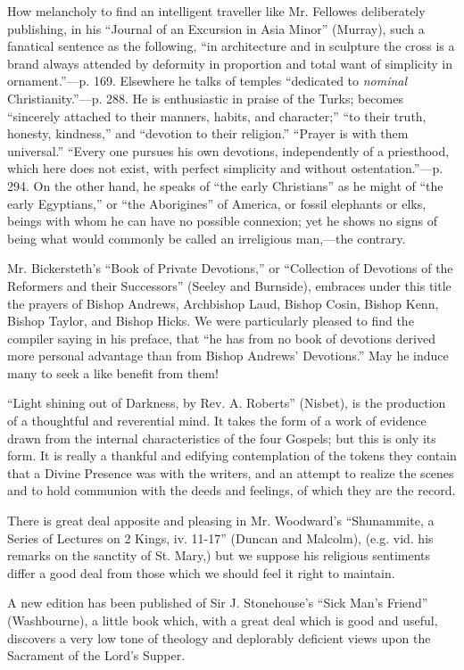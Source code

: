 How melancholy to find an intelligent traveller
like Mr. Fellowes deliberately publishing, in his ``Journal of an
Excursion in Asia Minor'' (Murray), such a fanatical sentence as the
following, ``in architecture and in sculpture the cross is a brand always
attended by deformity in proportion and total want of simplicity in
ornament.''—p. 169. Elsewhere he talks of temples ``dedicated to \emph{nominal}
Christianity.''—p. 288. He is enthusiastic in praise of the Turks;
becomes ``sincerely attached to their manners, habits, and character;'' ``to
their truth, honesty, kindness,'' and ``devotion to their religion.'' ``Prayer
is with them universal.'' ``Every one pursues his own devotions,
independently of a priesthood, which here does not exist, with perfect
simplicity and without ostentation.''—p. 294. On the other hand, he
speaks of ``the early Christians'' as he might of ``the early Egyptians,''
or ``the Aborigines'' of America, or fossil elephants or elks, beings with
whom he can have no possible connexion; yet he shows no signs of being
what would commonly be called an irreligious man,—the contrary.

Mr. Bickersteth's ``Book of Private Devotions,'' or ``Collection
of Devotions of the Reformers and their Successors'' (Seeley and
Burnside), embraces under this title the prayers of Bishop Andrews,
Archbishop Laud, Bishop Cosin, Bishop Kenn, Bishop Taylor, and Bishop
Hicks. We were particularly pleased to find the compiler saying in his
preface, that ``he has from no book of devotions derived more personal
advantage than from Bishop Andrews' Devotions.'' May he induce many to
seek a like benefit from them!

``Light shining out of Darkness, by Rev. A. Roberts''
(Nisbet), is the production of a thoughtful and reverential mind. It
takes the form of a work of evidence drawn from the internal
characteristics of the four Gospels; but this is only its form. It is
really a thankful and edifying contemplation of the tokens they contain
that a Divine Presence was with the writers, and an attempt to realize
the scenes and to hold communion with the deeds and feelings, of which
they are the record.

There is great deal apposite and pleasing in Mr.
Woodward's ``Shunammite, a Series of Lectures on 2 Kings, iv. 11-17''
(Duncan and Malcolm), (e.g. vid. his remarks on the sanctity of St.
Mary,) but we suppose his religious sentiments differ a good deal from
those which we should feel it right to maintain.

A new edition has been published of Sir J.
Stonehouse's ``Sick Man's Friend'' (Washbourne), a little book which, with
a great deal which is good and useful, discovers a very low tone of
theology and deplorably deficient views upon the Sacrament of the Lord's
Supper.

